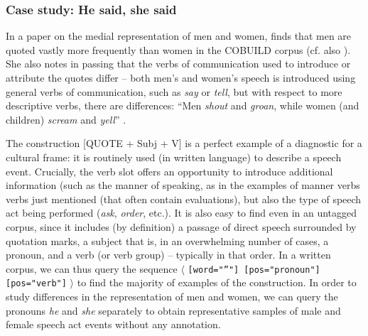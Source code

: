 \subsubsection{Case study: He said, she said}
\label{sec:hesaidshesaid}

In a paper on the medial representation of men and women,  \citet{caldas-coulthard_discourse_1993} finds that men are quoted vastly more frequently than women in the COBUILD corpus (cf. also ). She also notes in passing that the verbs  of communication used to introduce or attribute the quotes differ -- both men's and women's speech is introduced using general verbs of communication, such as \textit{say} or \textit{tell}, but with respect to more descriptive verbs, there are differences: ``Men \textit{shout} and \textit{groan}, while women (and children) \textit{scream } and \textit{yell}'' \citep[204]{caldas-coulthard_discourse_1993}.

The construction [QUOTE + Subj + V] is a perfect example of a diagnostic for a cultural  frame: it is routinely used (in written  language) to describe a speech event. Crucially, the verb  slot offers an opportunity to introduce additional information (such as the manner of speaking, as in the examples of manner verbs verbs just mentioned (that often contain evaluations), but also the type of speech act being performed (\textit{ask}, \textit{order}, etc.). It is also easy to find even in an untagged  corpus, since it includes (by definition) a passage of direct speech surrounded by quotation marks, a subject that is, in an overwhelming number of cases, a pronoun,  and a verb (or verb  group) -- typically in that order. In a written  corpus, we can thus query the sequence $\langle$ \texttt{[word="{''}"] [pos="pronoun"] [pos="verb"]} $\rangle$ to find the majority of examples of the construction. In order to study differences in the representation of men and women,  we can query the pronouns \textit{he} and \textit{she} separately to obtain representative  samples of male and female speech act events without any  annotation.

